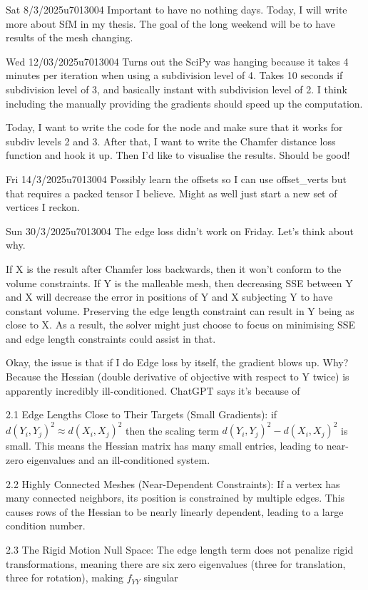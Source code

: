 \documentclass{project-logbook}
\begin{document}
	\begin{MeetingMinutes}{Sat 8/3/2025}{u7013004}
		Important to have no nothing days. Today, I will write more about SfM in my thesis. The goal of the long weekend will be to have results of the mesh changing.
	\end{MeetingMinutes}

	\begin{MeetingMinutes}{Wed 12/03/2025}{u7013004}
		Turns out the SciPy was hanging because it takes 4 minutes per iteration when using a subdivision level of 4. Takes 10 seconds if subdivision level of 3, and basically instant with subdivision level of 2. I think including the manually providing the gradients should speed up the computation.

		Today, I want to write the code for the node and make sure that it works for subdiv levels 2 and 3. After that, I want to write the Chamfer distance loss function and hook it up. Then I'd like to visualise the results. Should be good!
	\end{MeetingMinutes}

	\begin{MeetingMinutes}{Fri 14/3/2025}{u7013004}
		Possibly learn the offsets so I can use offset\_verts but that requires a packed tensor I believe. Might as well just start a new set of vertices I reckon.
	\end{MeetingMinutes}

	\begin{MeetingMinutes}{Sun 30/3/2025}{u7013004}
		The edge loss didn't work on Friday. Let's think about why.

		If X is the result after Chamfer loss backwards, then it won't conform to the volume constraints. If Y is the malleable mesh, then decreasing SSE between Y and X will decrease the error in positions of Y and X subjecting Y to have constant volume. Preserving the edge length constraint can result in Y being as close to X. As a result, the solver might just choose to focus on minimising SSE and edge length constraints could assist in that. 

		Okay, the issue is that if I do Edge loss by itself, the gradient blows up. Why? Because the Hessian (double derivative of objective with respect to Y twice) is apparently incredibly ill-conditioned. ChatGPT says it's because of 

		2.1 Edge Lengths Close to Their Targets (Small Gradients): if $d(Y_i, Y_j)^2 \approx d(X_i, X_j)^2$ then the scaling term $d(Y_i, Y_j)^2 - d(X_i, X_j)^2$ is small. This means the Hessian matrix has many small entries, leading to near-zero eigenvalues and an ill-conditioned system.

		2.2 Highly Connected Meshes (Near-Dependent Constraints): If a vertex has many connected neighbors, its position is constrained by multiple edges. This causes rows of the Hessian to be nearly linearly dependent, leading to a large condition number.

		2.3 The Rigid Motion Null Space: The edge length term does not penalize rigid transformations, meaning there are six zero eigenvalues (three for translation, three for rotation), making 
		$f_{YY}$ singular
	\end{MeetingMinutes}
\end{document}
